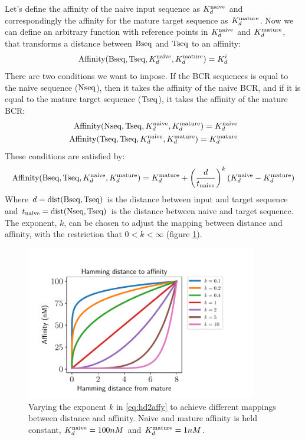 Let's define the affinity of the naive input sequence as $K^{\text{naive}}_d$ and correspondingly the affinity for the mature target sequence as $K^{\text{mature}}_d$.
Now we can define an arbitrary function with reference points in $K^{\text{naive}}_d$ and $K^{\text{mature}}_d$, that transforms a distance between $\text{Bseq}$ and $\text{Tseq}$ to an affinity:
$$
\text{Affinity}(\text{Bseq}, \text{Tseq}, K^{\text{naive}}_d, K^{\text{mature}}_d) = K^i_d
$$
There are two conditions we want to impose.
If the BCR sequences is equal to the naive sequence ($\text{Nseq}$), then it takes the affinity of the naive BCR, and if it is equal to the mature target sequence ($\text{Tseq}$), it takes the affinity of the mature BCR:
\begin{equation}
\begin{split}
\text{Affinity}(\text{Nseq}, \text{Tseq}, K^{\text{naive}}_d, K^{\text{mature}}_d) = K^{\text{naive}}_d \\
\text{Affinity}(\text{Tseq}, \text{Tseq}, K^{\text{naive}}_d, K^{\text{mature}}_d) = K^{\text{mature}}_d
\end{split}
\label{eq:hd2affy_cond}
\end{equation}
These conditions are satisfied by:
\begin{equation}
\text{Affinity}(\text{Bseq}, \text{Tseq}, K^{\text{naive}}_d, K^{\text{mature}}_d) = K^{\text{mature}}_d + \left ( \frac{d}{t_{\text{naive}}} \right )^k (K^{\text{naive}}_d - K^{\text{mature}}_d)
\label{eq:hd2affy}
\end{equation}
Where $d = \operatorname{dist}(\text{Bseq}, \text{Tseq})$ is the distance between input and target sequence and $t_{\text{naive}} = \operatorname{dist}(\text{Nseq}, \text{Tseq})$ is the distance between naive and target sequence.
The exponent, $k$, can be chosen to adjust the mapping between distance and affinity, with the restriction that $0 < k < \infty$ (figure \ref{fig:hd2affy}).

\begin{figure}[!h]
    \centering
    \includegraphics[width=0.9\textwidth]{figures/hd2affy.pdf}
    \caption{
        \label{fig:hd2affy}
        Varying the exponent $k$ in \eqref{eq:hd2affy} to achieve different mappings between distance and affinity.
        Naive and mature affinity is held constant, $K^{\text{naive}}_d = 100nM$ and $K^{\text{mature}}_d = 1nM$.
    }
\end{figure}

